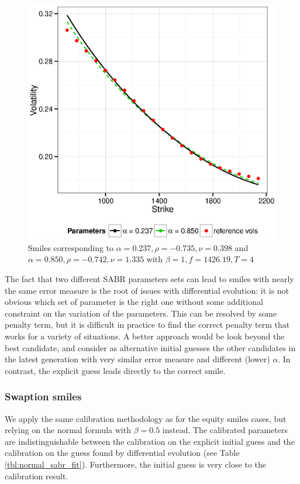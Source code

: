 \documentclass[]{rAMF2e}
\begin{document}
\begin{figure}[htbp]
  \caption{\label{fig:two_sabr_1_smile}Smiles corresponding to $\alpha= 0.237, \rho= -0.735, \nu= 0.398$ and $\alpha= 0.850, \rho= -0.742, \nu= 1.335$ with $\beta=1, f=1426.19, T=4$}
\begin{center}
 \includegraphics[width=14cm]{two_sabr_1_smile.eps}
\end{center}
\end{figure}
The fact that two different SABR parameters sets can lead to smiles with nearly the same error measure is the root of issues with differential evolution: it is not obvious which set of parameter is the right one without some additional constraint on the variation of the parameters. This can be resolved by some penalty term, but it is difficult in practice to find the correct penalty term that works for a variety of situations. A better approach would be look beyond the best candidate, and consider as alternative initial guesses the other candidates in the latest generation with very similar error measure and different (lower) $\alpha$. In contrast, the explicit guess leads directly to the correct smile.

\subsubsection{Swaption smiles}
We apply the same calibration methodology as for the equity smiles cases, but relying on the normal formula with $\beta=0.5$ instead. The calibrated parameters are indistinguishable between the calibration on the explicit initial guess and the calibration on the guess found by differential evolution (see Table \ref{tbl:normal_sabr_fit}). Furthermore, the initial guess is very close to the calibration result. 
\end{document}
